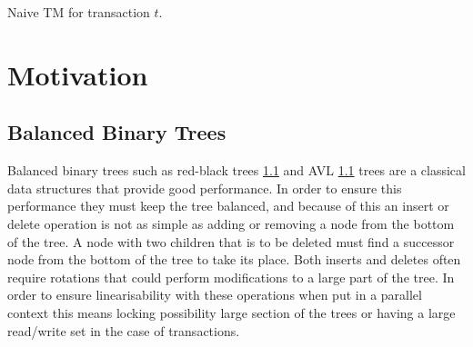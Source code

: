 \documentclass[10pt]{sigplanconf}
\begin{document}
\begin{algorithm}[!ht]%
  \caption{Naive TM for transaction $t$.}
  \begin{algorithmic}[1]
   {\size 
   		\EndPart
   	
		\Statex   	
   	
		\EndPart
		
		\Statex
		
		\EndPart
		
		\Statex		
		
   		\EndPart
	}
  \end{algorithmic}
\end{algorithm}


\section{Motivation}
\subsection{Balanced Binary Trees}
Balanced binary trees such as red-black trees \ref{} and AVL \ref{} trees are a classical data structures that provide good performance.
In order to ensure this performance they must keep the tree balanced, and because of this an insert or delete operation is not as simple as adding or removing a node from the bottom of the tree.
A node with two children that is to be deleted must find a successor node from the bottom of the tree to take its place.
Both inserts and deletes often require rotations that could perform modifications to a large part of the tree.
In order to ensure linearisability with these operations when put in a parallel context this means locking possibility large section of the trees or having a large read/write set in the case of transactions.
\end{document}
